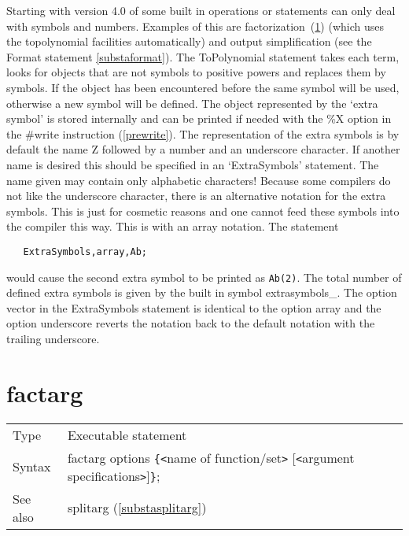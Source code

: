 \noindent Starting with version 4.0 of \FORM{} some built in operations or
statements can only deal with symbols and numbers. Examples of this are 
factorization~(\ref{substafactarg}) (which uses the topolynomial facilities 
automatically) and output simplification (see the Format 
statement \ref{substaformat}).
The ToPolynomial statement takes each term, looks for 
objects that are not symbols to positive powers and replaces them by 
symbols. If the object has been encountered before the same symbol will be 
used, otherwise a new symbol will be defined. The object represented by the 
`extra symbol' is stored internally and can be printed 
if needed with the \%X option in the \#write instruction (\ref{prewrite}). 
The representation of the extra symbols is by default the name Z followed 
by a number and an underscore character. If another name is desired this 
should be specified in an `ExtraSymbols' statement. The name given may 
contain only alphabetic characters! Because some compilers do not like the 
underscore character, there is an alternative notation for the extra 
symbols. This is just for cosmetic reasons and one cannot feed these 
symbols into the compiler this way. This is with an array notation. The 
statement
\begin{verbatim}
   ExtraSymbols,array,Ab;
\end{verbatim}
would cause the second extra symbol to be printed as {\tt Ab(2)}. The total 
number of defined extra symbols is given by the built in symbol 
extrasymbols\_.
The option vector in the ExtraSymbols statement is identical to the option 
array and the option underscore reverts the notation back to the default 
notation with the trailing underscore.
\vspace{10mm}


\section{factarg}
\label{substafactarg}

\noindent \begin{tabular}{ll}
Type & Executable statement\\
Syntax & factarg options \verb:{:{\tt<}name of function/set{\tt>}
                [{\tt<}argument specifications{\tt>}]\verb:}:;
\\ See also & splitarg (\ref{substasplitarg})
\end{tabular} \vspace{4mm}

